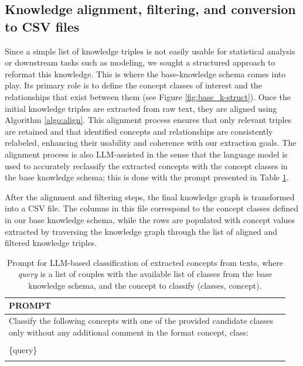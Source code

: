 \documentclass{article}
\begin{document}
\subsection{Knowledge alignment, filtering, and conversion to CSV files}
\par 
Since a simple list of knowledge triples is not easily usable for statistical analysis or downstream tasks such as modeling, we sought a structured approach to reformat this knowledge. This is where the base-knowledge schema comes into play. 
Its primary role is to define the concept classes of interest and the relationships that exist between them (see Figure \ref{fig:base_k-struct}). 
Once the initial knowledge triples are extracted from raw text, they are aligned using Algorithm \ref{algo:align}. 
This alignment process ensures that only relevant triples are retained and that identified concepts and relationships are consistently relabeled, enhancing their usability and coherence with our extraction goals. 
The alignment process is also LLM-assisted in the sense that the language model is used to accurately reclassify the extracted concepts with the concept classes in the base knowledge schema; this is done with the prompt presented in Table \ref{tab:kt_classification_tab}. 
\par
After the alignment and filtering steps, the final knowledge graph is transformed into a CSV file. 
The columns in this file correspond to the concept classes defined in our base knowledge schema, while the rows are populated with concept values extracted by traversing the knowledge graph through the list of aligned and filtered knowledge triples.

\begin{table}[ht]
\centering
\caption{Prompt for LLM-based classification of extracted concepts from texts, where \textit{query} is a list of couples with the available list of classes from the base knowledge schema, and the concept to classify (classes, concept).}\label{tab:kt_classification_tab}
\small
\begin{tabular}{p{0.95\linewidth}}
\toprule
\textbf{PROMPT} \\ 
\midrule
Classify the following concepts with one of the provided candidate classes only 
without any additional comment in the format concept, class: \\ \\
\{query\}  \\ \\
\bottomrule
\end{tabular}
\end{table}
\end{document}
